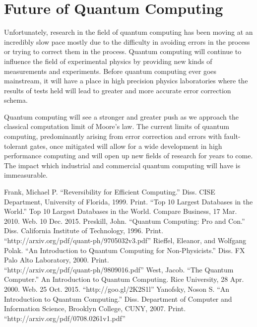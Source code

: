 \documentclass[12pt]{article}
\begin{document}
\section{Future of Quantum Computing}
Unfortunately, research in the field of quantum computing has been moving at an incredibly slow pace mostly due to the difficulty in avoiding errors in the process or trying to correct them in the process. Quantum computing will continue to influence the field of experimental physics by providing new kinds of measurements and experiments. Before quantum computing ever goes mainstream, it will have a place in high precision physics laboratories where the results of tests held will lead to greater and more accurate error correction schema.\cite{pro}\par
Quantum computing will see a stronger and greater push as we approach the classical computation limit of Moore's law. The current limits of quantum computing, predominantly arising from error correction and errors with fault-tolerant gates, once mitigated will allow for a wide development in high performance computing and will open up new fields of research for years to come. The impact which industrial and commercial quantum computing will have is immeasurable.







\newpage

\begin{thebibliography}{1}
Frank, Michael P. ``Reversibility for Efficient Computing.'' Diss. CISE Department, University of Florida, 1999. Print.
``Top 10 Largest Databases in the World.'' Top 10 Largest Databases in the World. Compare Business, 17 Mar. 2010. Web. 10 Dec. 2015.
Preskill, John. ``Quantum Computing: Pro and Con.'' Diss. California Institute of Technology, 1996. Print. \\``http://arxiv.org/pdf/quant-ph/9705032v3.pdf''
Rieffel, Eleanor, and Wolfgang Polak. ``An Introduction to Quantum Computing for Non-Physicists.'' Diss. FX Palo Alto Laboratory, 2000. Print. \\``http://arxiv.org/pdf/quant-ph/9809016.pdf''
West, Jacob. ``The Quantum Computer.'' An Introduction to Quantum Computing. Rice University, 28 Apr. 2000. Web. 25 Oct. 2015. ``http://goo.gl/2K2S1l''
Yanofsky, Noson S. ``An Introduction to Quantum Computing.'' Diss. Department of Computer and Information Science, Brooklyn College, CUNY, 2007. Print. ``http://arxiv.org/pdf/0708.0261v1.pdf''

\end{thebibliography}

\clearpage
\end{document}
